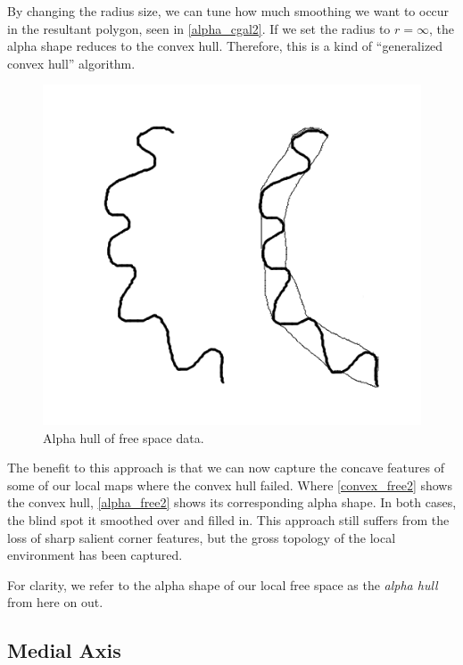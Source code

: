 By changing the radius size, we can tune how much smoothing we want to occur in the resultant polygon, seen in \autoref{alpha_cgal2}. If we set the radius to $r = \infty$, the alpha shape reduces to the convex hull. Therefore, this is a kind of ``generalized convex hull'' algorithm.

\begin{figure}[htbp]
\centering
\includegraphics[keepaspectratio,width=400pt,height=0.75\textheight]{4_alpha_freespace2.png}
\caption{Alpha hull of free space data.}
\label{alpha_free2}
\end{figure}



The benefit to this approach is that we can now capture the concave features of some of our local maps where the convex hull failed. Where \autoref{convex_free2} shows the convex hull, \autoref{alpha_free2} shows its corresponding alpha shape. In both cases, the blind spot it smoothed over and filled in. This approach still suffers from the loss of sharp salient corner features, but the gross topology of the local environment has been captured.

For clarity, we refer to the alpha shape of our local free space as the \emph{alpha hull} from here on out.

\subsection{Medial Axis}
\label{medialaxis}

